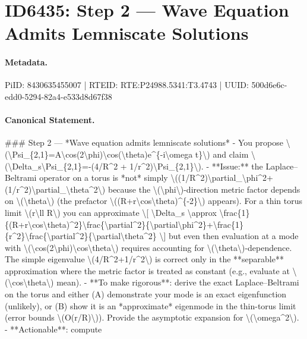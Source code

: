 \section*{ID6435: Step 2 — Wave Equation Admits Lemniscate Solutions}
\paragraph{Metadata.}
PiID: 8430635455007 | RTEID: RTE:P24988.5341:T3.4743 | UUID: 500d6e6c-edd0-5294-82a4-e533d8d67f38

\paragraph{Canonical Statement.}
\#\#\# Step 2 — *Wave equation admits lemniscate solutions* - You propose \textbackslash{}(\textbackslash{}Psi\_\{2,1\}=A\textbackslash{}cos(2\textbackslash{}phi)\textbackslash{}cos(\textbackslash{}theta)e\textasciicircum{}\{-i\textbackslash{}omega t\}\textbackslash{}) and claim \textbackslash{}(\textbackslash{}Delta\_s\textbackslash{}Psi\_\{2,1\}=-(4/R\textasciicircum{}2 + 1/r\textasciicircum{}2)\textbackslash{}Psi\_\{2,1\}\textbackslash{}). - **Issue:** the Laplace–Beltrami operator on a torus is *not* simply \textbackslash{}((1/R\textasciicircum{}2)\textbackslash{}partial\_\textbackslash{}phi\textasciicircum{}2+(1/r\textasciicircum{}2)\textbackslash{}partial\_\textbackslash{}theta\textasciicircum{}2\textbackslash{}) because the \textbackslash{}(\textbackslash{}phi\textbackslash{})-direction metric factor depends on \textbackslash{}(\textbackslash{}theta\textbackslash{}) (the prefactor \textbackslash{}((R+r\textbackslash{}cos\textbackslash{}theta)\textasciicircum{}\{-2\}\textbackslash{}) appears). For a thin torus limit \textbackslash{}(r\textbackslash{}ll R\textbackslash{}) you can approximate \textbackslash{}[ \textbackslash{}Delta\_s \textbackslash{}approx \textbackslash{}frac\{1\}\{(R+r\textbackslash{}cos\textbackslash{}theta)\textasciicircum{}2\}\textbackslash{}frac\{\textbackslash{}partial\textasciicircum{}2\}\{\textbackslash{}partial\textbackslash{}phi\textasciicircum{}2\}+\textbackslash{}frac\{1\}\{r\textasciicircum{}2\}\textbackslash{}frac\{\textbackslash{}partial\textasciicircum{}2\}\{\textbackslash{}partial\textbackslash{}theta\textasciicircum{}2\} \textbackslash{}] but even then evaluation at a mode with \textbackslash{}(\textbackslash{}cos(2\textbackslash{}phi)\textbackslash{}cos\textbackslash{}theta\textbackslash{}) requires accounting for \textbackslash{}(\textbackslash{}theta\textbackslash{})-dependence. The simple eigenvalue \textbackslash{}(4/R\textasciicircum{}2+1/r\textasciicircum{}2\textbackslash{}) is correct only in the **separable** approximation where the metric factor is treated as constant (e.g., evaluate at \textbackslash{}(\textbackslash{}cos\textbackslash{}theta\textbackslash{}) mean). - **To make rigorous**: derive the exact Laplace–Beltrami on the torus and either (A) demonstrate your mode is an exact eigenfunction (unlikely), or (B) show it is an *approximate* eigenmode in the thin-torus limit (error bounds \textbackslash{}(O(r/R)\textbackslash{})). Provide the asymptotic expansion for \textbackslash{}(\textbackslash{}omega\textasciicircum{}2\textbackslash{}). - **Actionable**: compute 